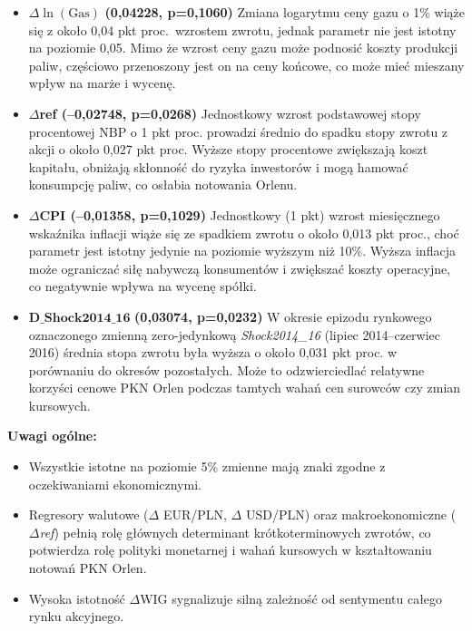 \documentclass[12pt, twoside]{article}
\begin{document}
\begin{itemize}
  \item \(\Delta\ln(\mathrm{Gas})\) \textbf{(0,04228, p=0,1060)}  
    Zmiana logarytmu ceny gazu o 1\% wiąże się z około 0,04 pkt proc.\ wzrostem zwrotu, jednak parametr nie jest istotny na poziomie 0,05. Mimo że wzrost ceny gazu może podnosić koszty produkcji paliw, częściowo przenoszony jest on na ceny końcowe, co może mieć mieszany wpływ na marże i wycenę.

  \item \(\Delta\)\textbf{ref (–0,02748, p=0,0268)}  
    Jednostkowy wzrost podstawowej stopy procentowej NBP o 1 pkt proc. prowadzi średnio do spadku stopy zwrotu z akcji o około 0,027 pkt proc. Wyższe stopy procentowe zwiększają koszt kapitału, obniżają skłonność do ryzyka inwestorów i mogą hamować konsumpcję paliw, co osłabia notowania Orlenu.

  \item \(\Delta\)\textbf{CPI (–0,01358, p=0,1029)}  
    Jednostkowy (1 pkt) wzrost miesięcznego wskaźnika inflacji wiąże się ze spadkiem zwrotu o około 0,013 pkt proc., choć parametr jest istotny jedynie na poziomie wyższym niż 10\%. Wyższa inflacja może ograniczać siłę nabywczą konsumentów i zwiększać koszty operacyjne, co negatywnie wpływa na wycenę spółki.

  \item \(\mathbf{D\_Shock2014\_16}\) \textbf{(0,03074, p=0,0232)}  
    W okresie epizodu rynkowego oznaczonego zmienną zero-jedynkową \textit{Shock2014\_16} (lipiec 2014–czerwiec 2016) średnia stopa zwrotu była wyższa o około 0,031 pkt proc. w porównaniu do okresów pozostałych. Może to odzwierciedlać relatywne korzyści cenowe PKN Orlen podczas tamtych wahań cen surowców czy zmian kursowych.
\end{itemize}

\noindent
\textbf{Uwagi ogólne:}
\begin{itemize}
  \item Wszystkie istotne na poziomie 5\% zmienne mają znaki zgodne z oczekiwaniami ekonomicznymi.
  \item Regresory walutowe (\(\Delta\) EUR/PLN, \(\Delta\) USD/PLN) oraz makroekonomiczne (\(\Delta\)\textit{ref}) pełnią rolę głównych determinant krótkoterminowych zwrotów, co potwierdza rolę polityki monetarnej i wahań kursowych w kształtowaniu notowań PKN Orlen.
  \item Wysoka istotność \(\Delta\)WIG sygnalizuje silną zależność od sentymentu całego rynku akcyjnego.
\end{itemize}
\end{document}
